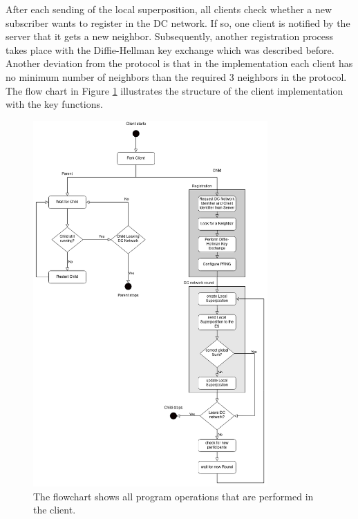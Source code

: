 After each sending of the local superposition, all clients check whether a new subscriber wants to register in the DC network. If so, one client is notified by the server that it gets a new neighbor. Subsequently, another registration process takes place with the Diffie-Hellman key exchange which was described before. Another deviation from the protocol is that in the implementation each client has no minimum number of neighbors than the required 3 neighbors in the protocol. The flow chart in Figure \ref{fig:Client Implementation} illustrates the structure of the client implementation with the key functions.
\begin{figure}[tbp]
  \centering
  \includegraphics[width=0.8\textwidth]{images/Client_structure.png}
  \caption[Flowchart Client Implementatioen]{The flowchart shows all program operations that are performed in the client.}
  \label{fig:Client Implementation}
\end{figure}

